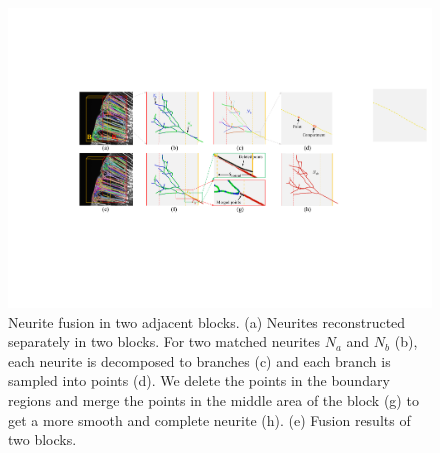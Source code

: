  
 \begin{figure}[t]
 	\centering
 	\includegraphics[width=1\columnwidth]{./Illustrations/fusion_algorithm.pdf}
 	\caption{Neurite fusion in two adjacent blocks. (a) Neurites reconstructed separately in two blocks. For two matched neurites $N_a$ and $N_b$ (b), each neurite is decomposed to branches (c) and each branch is sampled into points (d). We delete the points in the boundary regions and merge the points in the middle area of the block (g) to get a more smooth and complete neurite (h). (e) Fusion results of two blocks. }
 	\label{fig:fusion_algorithm}
 \end{figure}
 
 



